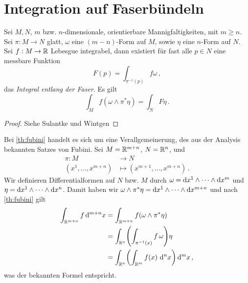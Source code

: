 \section[Integration inv Fkt]{Integration auf Faserbündeln}
\begin{theorem}\label{th:fubini}
Sei $M,N$, $m$ bzw. $n$-dimensionale, orientierbare Mannigfaltigkeiten, mit
$m\geq n$.
Sei $\pi:M\to N$ glatt, $\omega$ eine $(m-n)$-Form auf $M$, sowie $\eta$
eine $n$-Form auf $N$. Sei $f:M\to \mathbb{R}$ Lebesgue integrabel, dann existiert 
für fast alle $p\in N$ eine messbare Funktion
\begin{equation}
F(p)=\int_{\pi^{-1}(p)}f\omega\,,
\end{equation}
das \emph{Integral entlang der Faser}. Es gilt
\begin{equation}
\int_{M}f(\omega\wedge\pi^*\eta)=\int_{N}F \eta\,.
\end{equation}
\end{theorem}
\begin{proof}
Siehe Sulantke und Wintgen
\end{proof}
\begin{bemerkung}
Bei \autoref{th:fubini} handelt es sich um eine Verallgemeinerung, des aus der
Analysis bekannten Satzes von Fubini.
Sei $M=\mathbb{R}^{m+n}$, $N=\mathbb{R}^n$, und
\begin{align*}
\pi :M &\to N\\
(x^1,\dots,x^{m+n}) &\mapsto (x^{m+1},\dots,x^{m+n})\,.
\end{align*}
Wir definieren Differentialformen auf $N$ bzw. $M$ durch
$\omega=\dif{x}^1\wedge\cdots\wedge\dif{x}^m$ und\\
$\eta=\dif{x}^{1}\wedge\cdots\wedge\dif{x}^n$. Damit haben wir
$\omega\wedge\pi^*\eta=\dif x^1\wedge\cdots\wedge \dif x^{m+n}$
und nach \autoref{th:fubini} gilt
\begin{equation}
\begin{split}
\int_{\Reals^{m+n}} f\dif{}^{m+n} x 
&= \int_{\Reals^{m+n}}f(\omega\wedge\pi^*\eta)\\
&= \int_{\Reals^n}\left(\int_{\pi^{-1}(x)}f\,\omega\right)\eta\\
&=
\int_{\Reals^n}\left(\int_{\Reals^{m}}f\left(x\right)\,\dif{}^nx\right)\dif{}^mx\,,
\end{split}
\end{equation}
was der bekannten Formel entspricht.
\end{bemerkung}
